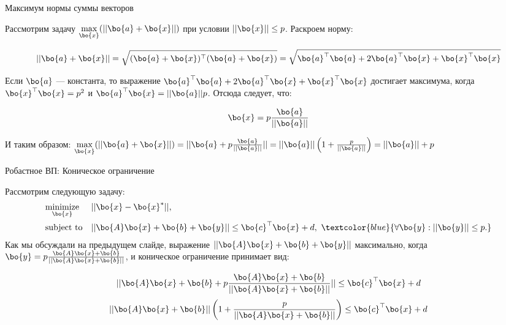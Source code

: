 \documentclass{beamer}
\begin{document}
\begin{frame}{Максимум нормы суммы векторов}
	\begin{flushleft}
		
		Рассмотрим задачу $\underset{\bo{x}}{\text{max}}(|| \bo{a} + \bo{x}||)$ при условии $|| \bo{x} || \leq p$. Раскроем норму:
		
		\begin{equation}
			|| \bo{a} + \bo{x} || = 
			\sqrt{(\bo{a} + \bo{x})^\top (\bo{a} + \bo{x})} = 
			\sqrt{\bo{a}^\top\bo{a} + 2\bo{a}^\top\bo{x} + \bo{x}^\top\bo{x}}
		\end{equation}
		
		Если $\bo{a}$ — константа, то выражение $\bo{a}^\top\bo{a} + 2\bo{a}^\top\bo{x} + \bo{x}^\top\bo{x}$ достигает максимума, когда $\bo{x}^\top\bo{x} = p^2$ и $\bo{a}^\top\bo{x} = ||\bo{a}||p$. Отсюда следует, что:
		
		\begin{equation}
			\bo{x} = p\frac{\bo{a}}{|| \bo{a} ||}
		\end{equation}
		
		И таким образом: $\underset{\bo{x}}{\text{max}}(|| \bo{a} + \bo{x}||) = 
		|| \bo{a} + p\frac{\bo{a}}{|| \bo{a} ||}|| = 
		|| \bo{a} || \left( 1 + \frac{p}{|| \bo{a} ||} \right) = 
		|| \bo{a} || + p $	
		
	\end{flushleft}
\end{frame}

\begin{frame}{Робастное ВП: Коническое ограничение}
	\begin{flushleft}
		
		Рассмотрим следующую задачу:
		\begin{equation}
			\begin{aligned}
				& \underset{\bo{x}}{\text{minimize}} 
				& & ||\bo{x} - \bo{x}^*||, \\
				& \text{subject to}
				& & || \bo{A}\bo{x} + \bo{b} + \bo{y} || \leq \bo{c}^\top \bo{x} + d, \ 
				\textcolor{blue}{
					\forall \bo{y} : ||\bo{y}|| \leq p.} 
			\end{aligned}
		\end{equation}
		Как мы обсуждали на предыдущем слайде, выражение $|| \bo{A}\bo{x} + \bo{b} + \bo{y} ||$ максимально, когда $\bo{y} = p \frac{\bo{A}\bo{x} + \bo{b}}{|| \bo{A}\bo{x} + \bo{b} ||}$, и коническое ограничение принимает вид:
		
		\begin{equation}
			|| \bo{A}\bo{x} + \bo{b} + p \frac{\bo{A}\bo{x} + \bo{b}}{|| \bo{A}\bo{x} + \bo{b} ||} || \leq \bo{c}^\top \bo{x} + d
		\end{equation}
		\begin{equation}
			|| \bo{A}\bo{x} + \bo{b}|| \left( 1 + \frac{p}{|| \bo{A}\bo{x} + \bo{b}||} \right) \leq \bo{c}^\top \bo{x} + d
		\end{equation}
		
		
	\end{flushleft}
\end{frame}
\end{document}
